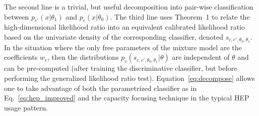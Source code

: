 \documentclass[aoas,preprint]{imsart}
\numberwithin{equation}{section}
\theoremstyle{plain}
\begin{document}
The second line is a trivial, but useful decomposition into pair-wise classification between $p_{c'}(x|\theta_1)$ and $p_c(x|\theta_0)$.  The third line uses Theorem~1 to relate the high-dimensional likelihood ratio into an equivalent calibrated likelihood ratio based on the univariate density of the corresponding classifier, denoted $s_{c,c',\theta_0, \theta_1}$. In the situation where the only free parameters of the mixture model are the coefficients $w_c$, then the distributions $p_{c}(s_{c,c',\theta_0, \theta_1}| \theta)$ are independent of $\theta$ and can be pre-computed (after training the discriminative classifier, but before performing the generalized likelihood ratio test). Equation~\ref{eq:decompose} allows one to take advantage of both the parametrized classifier as in Eq.~\ref{eq:hep_improved} and the capacity focusing technique in the typical HEP usage pattern. 


%


\end{document}
